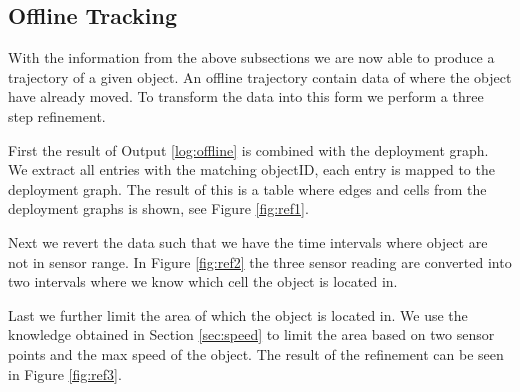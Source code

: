 \subsection{Offline Tracking}
\label{sub:offline}
With the information from the above subsections we are now able to produce a trajectory of a given object.
An offline trajectory contain data of where the object have already moved.
To transform the data into this form we perform a three step refinement.

First the result of Output \ref{log:offline} is combined with the deployment graph.
We extract all entries with the matching objectID, each entry is mapped to the deployment graph.
The result of this is a table where edges and cells from the deployment graphs is shown, see Figure \ref{fig:ref1}.  

Next we revert the data such that we have the time intervals where object are not in sensor range.
In Figure \ref{fig:ref2} the three sensor reading are converted into two intervals where we know which cell the object is located in.

Last we further limit the area of which the object is located in. 
We use the knowledge obtained in Section \ref{sec:speed} to limit the area based on two sensor points and the max speed of the object.
The result of the refinement can be seen in Figure \ref{fig:ref3}.
 


